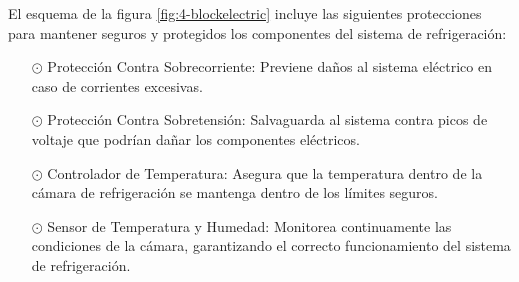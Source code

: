 El esquema de la figura \ref{fig:4-blockelectric} incluye las siguientes protecciones para mantener seguros y protegidos los componentes del sistema de refrigeración:
\begin{itemize}


	\item[$\odot$] Protección Contra Sobrecorriente: Previene daños al sistema eléctrico en caso de corrientes excesivas.

\item[$\odot$] Protección Contra Sobretensión: Salvaguarda al sistema contra picos de voltaje que podrían dañar los componentes eléctricos.

\item[$\odot$] Controlador de Temperatura: Asegura que la temperatura dentro de la cámara de refrigeración se mantenga dentro de los límites seguros.

\item[$\odot$] Sensor de Temperatura y Humedad: Monitorea continuamente las condiciones de la cámara, garantizando el correcto funcionamiento del sistema de refrigeración.

\end{itemize}
